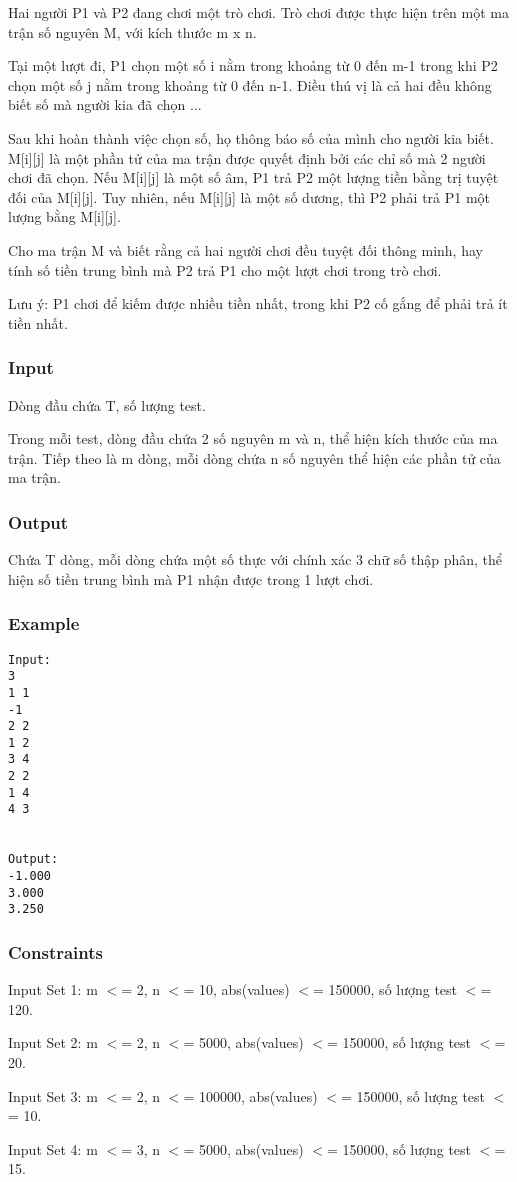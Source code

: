 



   Hai người P1 và P2 đang chơi một trò chơi. Trò chơi được thực hiện trên một ma trận số nguyên M, với kích thước m x n.  

   Tại một lượt đi, P1 chọn một số i nằm trong khoảng từ 0 đến m-1 trong khi P2 chọn một số j nằm trong khoảng từ 0 đến n-1. Điều thú vị là cả hai đều không biết số mà người kia đã chọn ...  

   Sau khi hoàn thành việc chọn số, họ thông báo số của mình cho người kia biết. M[i][j] là một phần tử của ma trận được quyết định bởi các chỉ số mà 2 người chơi đã chọn. Nếu M[i][j] là một số âm, P1 trả P2 một lượng tiền bằng trị tuyệt đối của M[i][j]. Tuy nhiên, nếu M[i][j] là một số dương, thì P2 phải trả P1 một lượng bằng M[i][j].  

   Cho ma trận M và biết rằng cả hai người chơi đều tuyệt đối thông minh, hay tính số tiền trung bình mà P2 trả P1 cho một lượt chơi trong trò chơi.  

   Lưu ý: P1 chơi để kiếm được nhiều tiền nhất, trong khi P2 cố gắng để phải trả ít tiền nhất.  

\subsubsection{   Input  }

   Dòng đầu chứa T, số lượng test.  

   Trong mỗi test, dòng đầu chứa 2 số nguyên m và n, thể hiện kích thước của ma trận. Tiếp theo là m dòng, mỗi dòng chứa n số nguyên thể hiện các phần tử của ma trận.  

\subsubsection{   Output  }

   Chứa T dòng, mỗi dòng chứa một số thực với chính xác 3 chữ số thập phân, thể hiện số tiền trung bình mà P1 nhận được trong 1 lượt chơi.  

\subsubsection{   Example  }
\begin{verbatim}
Input:
3
1 1
-1
2 2
1 2
3 4
2 2
1 4
4 3


Output:
-1.000
3.000
3.250
\end{verbatim}

\subsubsection{   Constraints  }

   Input Set 1: m $<$= 2, n $<$= 10, abs(values) $<$= 150000, số lượng test $<$= 120.  

   Input Set 2: m $<$= 2, n $<$= 5000, abs(values) $<$= 150000, số lượng test $<$= 20.  

   Input Set 3: m $<$= 2, n $<$= 100000, abs(values) $<$= 150000, số lượng test $<$= 10.  

   Input Set 4: m $<$= 3, n $<$= 5000, abs(values) $<$= 150000, số lượng test $<$= 15.  